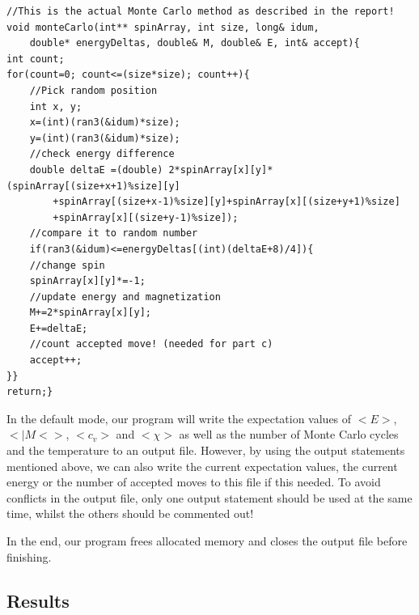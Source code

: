 \documentclass[10pt,a4paper]{article}
\begin{document}
\begin{lstlisting}
//This is the actual Monte Carlo method as described in the report!
void monteCarlo(int** spinArray, int size, long& idum,
	double* energyDeltas, double& M, double& E, int& accept){
int count;
for(count=0; count<=(size*size); count++){
	//Pick random position
	int x, y;
	x=(int)(ran3(&idum)*size);
	y=(int)(ran3(&idum)*size);
	//check energy difference
	double deltaE =(double) 2*spinArray[x][y]*(spinArray[(size+x+1)%size][y]
		+spinArray[(size+x-1)%size][y]+spinArray[x][(size+y+1)%size]
		+spinArray[x][(size+y-1)%size]);
	//compare it to random number
	if(ran3(&idum)<=energyDeltas[(int)(deltaE+8)/4]){
	//change spin
	spinArray[x][y]*=-1;
	//update energy and magnetization
	M+=2*spinArray[x][y];
	E+=deltaE;
	//count accepted move! (needed for part c)
	accept++;
}}
return;}
\end{lstlisting}

In the default mode, our program will write the expectation values of $<E>$, $<|M<>$, $<c_v>$ and $<\chi>$ as well as the number of Monte Carlo cycles and the temperature to an output file. However, by using the output statements mentioned above, we can also write the current expectation values, the current energy or the number of accepted moves to this file if this needed. To avoid conflicts in the output file, only one output statement should be used at the same time, whilst the others should be commented out!

In the end, our program frees allocated memory and closes the output file before finishing.


\subsection{Results}
\end{document}
